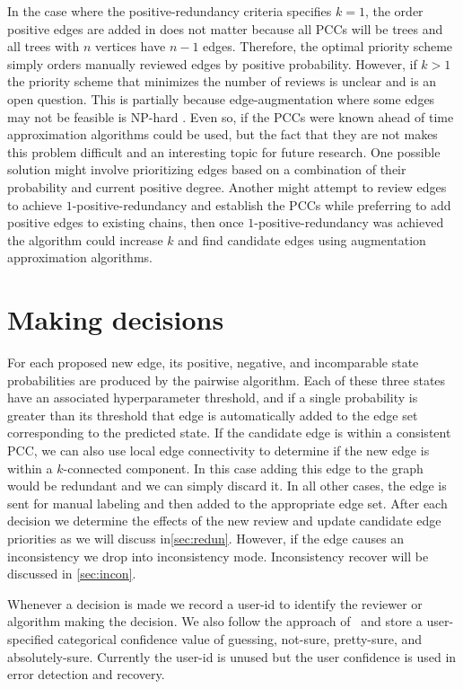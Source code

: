 In the case where the positive-redundancy criteria specifies $k=1$, the order
  positive edges are added in does not matter because all PCCs will be trees and
  all trees with $n$ vertices have $n-1$ edges.
Therefore, the optimal priority scheme simply orders manually reviewed edges
  by positive probability.
However, if $k>1$ the priority scheme that minimizes the number of reviews is
  unclear and is an open question.
This is partially because edge-augmentation where some edges may not be
  feasible is NP-hard \cite{khuller_approximation_1993}.
Even so, if the PCCs were known ahead of time approximation algorithms could
  be used, but the fact that they are not makes this problem difficult and an
  interesting topic for future research.
One possible solution might involve prioritizing edges based on a combination
  of their probability and current positive degree.
Another might attempt to review edges to achieve $1$-positive-redundancy and
  establish the PCCs while preferring to add positive edges to existing chains,
  then once $1$-positive-redundancy was achieved the algorithm could increase
  $k$ and find candidate edges using augmentation approximation algorithms.

\section{Making decisions}\label{sec:decision}

For each proposed new edge, its positive, negative, and incomparable state
  probabilities are produced by the pairwise algorithm.
Each of these three states have an associated hyperparameter threshold, and if
  a single probability is greater than its threshold that edge is automatically
  added to the edge set corresponding to the predicted state.
If the candidate edge is within a consistent PCC, we can also use local edge
  connectivity to determine if the new edge is within a $k$-connected component.
In this case adding this edge to the graph would be redundant and we can
  simply discard it.
In all other cases, the edge is sent for manual labeling and then added to the
  appropriate edge set.
After each decision we determine the effects of the new review and update
  candidate edge priorities as we will discuss in\cref{sec:redun}.
However, if the edge causes an inconsistency we drop into inconsistency mode.
Inconsistency recover will be discussed in \cref{sec:incon}.

Whenever a decision is made we record a user-id to identify the reviewer or
  algorithm making the decision.
We also follow the approach of~\cite{branson_visual_2010} and store a
  user-specified categorical confidence value of guessing, not-sure,
  pretty-sure, and absolutely-sure.
Currently the user-id is unused but the user confidence is used in error
  detection and recovery.


